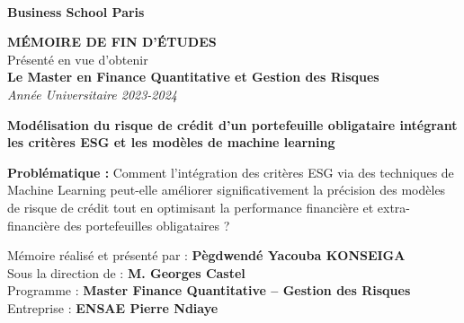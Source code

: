 \documentclass[a4paper]{article}
\begin{document}

\vspace{1.5cm}

\begin{center}
    \\[0.3cm]
    {\Large \textbf{Business School Paris}}\\[1cm]
\end{center}

\begin{center}
    {\LARGE \textbf{MÉMOIRE DE FIN D'ÉTUDES}}\\[0.5cm]
    {\large Présenté en vue d'obtenir}\\[0.3cm]
    {\Large \textbf{Le Master en Finance Quantitative et Gestion des Risques}}\\[0.5cm]
    {\textit{Année Universitaire 2023-2024}}\\[1.5cm]
\end{center}

\begin{center}
    {\huge \textbf{Modélisation du risque de crédit d'un portefeuille obligataire intégrant les critères ESG et les modèles de machine learning}}\\[1cm]
\end{center}

\begin{flushleft}
    \textbf{Problématique :} Comment l'intégration des critères ESG via des techniques de Machine Learning peut-elle améliorer significativement la précision des modèles de risque de crédit tout en optimisant la performance financière et extra-financière des portefeuilles obligataires ?\\[1.5cm]
\end{flushleft}

\begin{center}
    Mémoire réalisé et présenté par : \textbf{Pègdwendé Yacouba KONSEIGA}\\[0.8cm]
    
    Sous la direction de : \textbf{M. Georges Castel}\\[0.8cm]
    
    Programme : \textbf{Master Finance Quantitative -- Gestion des Risques}\\[0.5cm]
    
    Entreprise : \textbf{ENSAE Pierre Ndiaye}\\[0.8cm]
\end{center}

\vfill
\begin{center}
\end{center}

\vspace{0.5cm}
\end{document}
